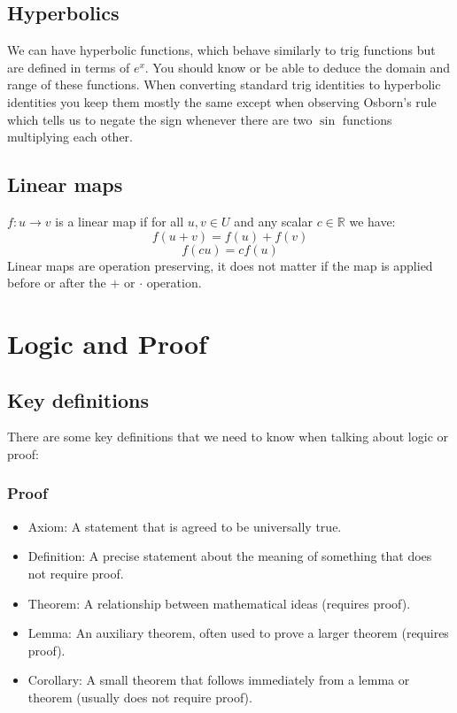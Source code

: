 \documentclass[12pt]{article}
\begin{document}
\subsection*{Hyperbolics}
We can have hyperbolic functions, which behave similarly to trig functions but are defined in terms of \(e^x\). You should know or be able to deduce the domain and range of these functions. When converting standard trig identities to hyperbolic identities you keep them mostly the same except when observing Osborn's rule which tells us to negate the sign whenever there are two \(\sin\) functions multiplying each other.
\subsection*{Linear maps}
\(f:u\to v\) is a linear map if for all \(u,v\in U\) and any scalar \(c\in\mathbb{R}\) we have:
\[f(u+v)=f(u)+f(v)\]
\[f(cu)=cf(u)\]
Linear maps are operation preserving, it does not matter if the map is applied before or after the \(+\) or \(\cdot\) operation.
\section{Logic and Proof}
\subsection*{Key definitions}
There are some key definitions that we need to know when talking about logic or proof:
\subsubsection*{Proof}
\begin{itemize}
    \item Axiom: A statement that is agreed to be universally true.
    \item Definition: A precise statement about the meaning of something that does not require proof.
    \item Theorem: A relationship between mathematical ideas (requires proof).
    \item Lemma: An auxiliary theorem, often used to prove a larger theorem (requires proof).
    \item Corollary: A small theorem that follows immediately from a lemma or theorem (usually does not require proof).
\end{itemize}
\end{document}
